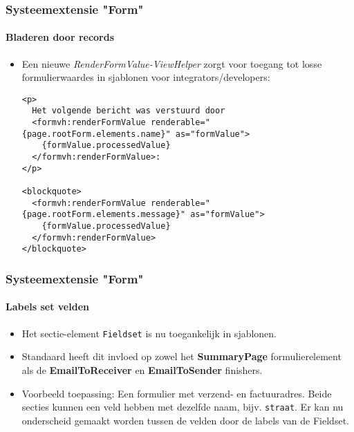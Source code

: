 
\begin{frame}[fragile]
	\frametitle{Systeemextensie "Form"}
	\framesubtitle{Bladeren door records}

	\lstset{basicstyle=\tiny\ttfamily}

	\begin{itemize}
		\item Een nieuwe \textit{RenderFormValue-ViewHelper} zorgt voor toegang tot losse formulierwaardes in sjablonen voor integrators/developers:
\begin{lstlisting}
<p>
  Het volgende bericht was verstuurd door
  <formvh:renderFormValue renderable="{page.rootForm.elements.name}" as="formValue">
    {formValue.processedValue}
  </formvh:renderFormValue>:
</p>

<blockquote>
  <formvh:renderFormValue renderable="{page.rootForm.elements.message}" as="formValue">
    {formValue.processedValue}
  </formvh:renderFormValue>
</blockquote>
\end{lstlisting}

	\end{itemize}

\end{frame}


\begin{frame}[fragile]
	\frametitle{Systeemextensie "Form"}
	\framesubtitle{Labels set velden}

	\begin{itemize}
		\item Het sectie-element \texttt{Fieldset} is nu toegankelijk in sjablonen.
		\item Standaard heeft dit invloed op zowel het \textbf{SummaryPage} formulierelement als de \textbf{EmailToReceiver} en \textbf{EmailToSender} finishers.
		\item Voorbeeld toepassing:\newline
			\small
				Een formulier met verzend- en factuuradres. Beide secties kunnen een veld hebben met dezelfde naam, bijv. \texttt{straat}.
				Er kan nu onderscheid gemaakt worden tussen de velden door de labels van de Fieldset.
			\normalsize

	\end{itemize}

\end{frame}

